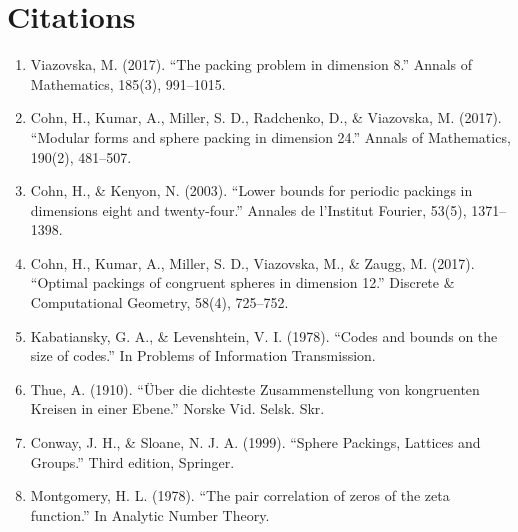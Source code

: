 \section{Citations}

\begin{enumerate}
\item Viazovska, M. (2017). ``The packing problem in dimension 8.'' Annals of Mathematics, 185(3), 991--1015.
\item Cohn, H., Kumar, A., Miller, S. D., Radchenko, D., \& Viazovska, M. (2017). ``Modular forms and sphere packing in dimension 24.'' Annals of Mathematics, 190(2), 481--507.
\item Cohn, H., \& Kenyon, N. (2003). ``Lower bounds for periodic packings in dimensions eight and twenty-four.'' Annales de l'Institut Fourier, 53(5), 1371--1398.
\item Cohn, H., Kumar, A., Miller, S. D., Viazovska, M., \& Zaugg, M. (2017). ``Optimal packings of congruent spheres in dimension 12.'' Discrete \& Computational Geometry, 58(4), 725--752.
\item Kabatiansky, G. A., \& Levenshtein, V. I. (1978). ``Codes and bounds on the size of codes.'' In Problems of Information Transmission.
\item Thue, A. (1910). ``\"{U}ber die dichteste Zusammenstellung von kongruenten Kreisen in einer Ebene.'' Norske Vid. Selsk. Skr.
\item Conway, J. H., \& Sloane, N. J. A. (1999). ``Sphere Packings, Lattices and Groups.'' Third edition, Springer.
\item Montgomery, H. L. (1978). ``The pair correlation of zeros of the zeta function.'' In Analytic Number Theory.
\end{enumerate}